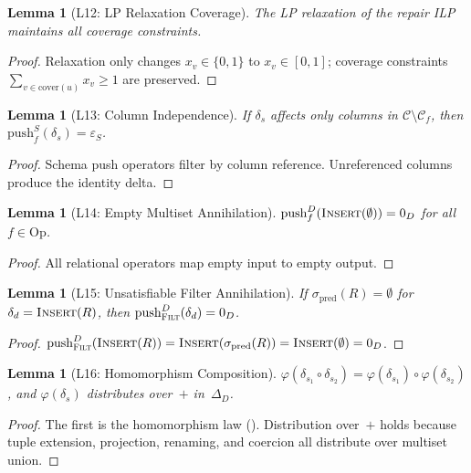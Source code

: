 \documentclass[11pt,a4paper]{article}
\newtheorem{lemma}[theorem]{Lemma}
\theoremstyle{definition}
\newcommand{\DeltaD}{\Delta_{\!D}}
\newcommand{\epsS}{\varepsilon_S}
\newcommand{\zeroD}{0_D}
\newcommand{\push}{\mathrm{push}}
\newcommand{\Op}{\mathrm{Op}}
\begin{document}
\begin{lemma}[L12: LP Relaxation Coverage]\label{lem:lp-coverage}
The LP relaxation of the repair ILP maintains all coverage constraints.
\end{lemma}
\begin{proof}
Relaxation only changes $x_v \in \{0,1\}$ to $x_v \in [0,1]$; coverage
constraints $\sum_{v \in \mathrm{cover}(u)} x_v \geq 1$ are preserved.
\end{proof}

\begin{lemma}[L13: Column Independence]\label{lem:col-independence}
If $\delta_s$ affects only columns in $\mathcal{C} \setminus \mathcal{C}_f$,
then $\push_f^S(\delta_s) = \epsS$.
\end{lemma}
\begin{proof}
Schema push operators filter by column reference.  Unreferenced columns produce
the identity delta.
\end{proof}

\begin{lemma}[L14: Empty Multiset Annihilation]\label{lem:empty-ann}
$\push_f^D(\textsc{Insert}(\emptyset)) = \zeroD$ for all $f \in \Op$.
\end{lemma}
\begin{proof}
All relational operators map empty input to empty output.
\end{proof}

\begin{lemma}[L15: Unsatisfiable Filter Annihilation]\label{lem:filter-ann}
If $\sigma_{\mathrm{pred}}(R) = \emptyset$ for $\delta_d = \textsc{Insert}(R)$,
then $\push_{\textsc{Filt}}^D(\delta_d) = \zeroD$.
\end{lemma}
\begin{proof}
$\push_{\textsc{Filt}}^D(\textsc{Insert}(R))
= \textsc{Insert}(\sigma_{\mathrm{pred}}(R))
= \textsc{Insert}(\emptyset) = \zeroD$.
\end{proof}

\begin{lemma}[L16: Homomorphism Composition]\label{lem:homo-compose}
$\varphi(\delta_{s_1} \circ \delta_{s_2}) = \varphi(\delta_{s_1}) \circ
\varphi(\delta_{s_2})$, and $\varphi(\delta_s)$ distributes over~$+$
in~$\DeltaD$.
\end{lemma}
\begin{proof}
The first is the homomorphism law ().  Distribution over~$+$
holds because tuple extension, projection, renaming, and coercion all
distribute over multiset union.
\end{proof}
\end{document}
